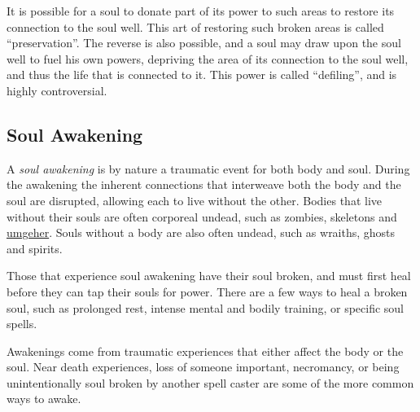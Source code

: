 It is possible for a soul to donate part of its power to such areas to restore
its connection to the soul well. This art of restoring such broken areas is
called ``preservation''. The reverse is also possible, and a soul may draw
upon the soul well to fuel his own powers, depriving the area of its connection
to the soul well, and thus the life that is connected to it. This power is
called ``defiling'', and is highly controversial.


\subsection{Soul Awakening}
\label{sec:Soul Awakening}

A \emph{soul awakening} is by nature a traumatic event for both body and soul.
During the awakening the inherent connections that interweave both the body and
the soul are disrupted, allowing each to live without the other. Bodies that
live without their souls are often corporeal undead, such as zombies,
skeletons and \hyperref[sec:Umgeher]{umgeher}. Souls without a body are also
often undead, such as wraiths, ghosts and spirits.

Those that experience soul awakening have their soul broken, and must first
heal before they can tap their souls for power. There are a few ways to heal
a broken soul, such as prolonged rest, intense mental and bodily training, or
specific soul spells.

Awakenings come from traumatic experiences that either affect the body or the
soul. Near death experiences, loss of someone important, necromancy, or being
unintentionally soul broken by another spell caster are some of the more
common ways to awake.

